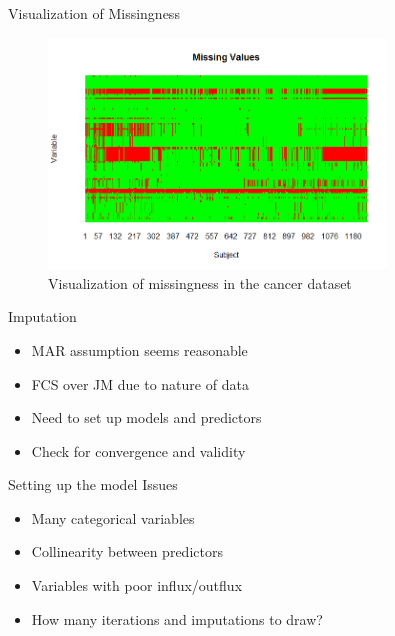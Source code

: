 \begin{frame}{Visualization of Missingness}
 \begin{figure}[h!]
  \centering
    \includegraphics[width=0.8\textwidth]{missingvalues_plot.png}
  \caption{Visualization of missingness in the cancer dataset}
\label{fig:missingplot}

\end{figure}
\end{frame}

\begin{frame}{Imputation}
 \begin{itemize}
  \item MAR assumption seems reasonable
  \item FCS over JM due to nature of data
  \item Need to set up models and predictors
  \item Check for convergence and validity
 \end{itemize}

\end{frame}

\begin{frame}{Setting up the model}
Issues
\begin{itemize}
 \item Many categorical variables 
 \item Collinearity between predictors
 \item Variables with poor influx/outflux \cite{VanBuuren2012}
 \item How many iterations and imputations to draw?
\end{itemize}

 
\end{frame}


